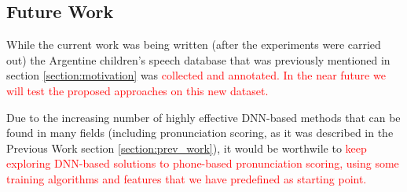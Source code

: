 \subsection{Future Work}

While the current work was being written (after the experiments were carried out)
the Argentine children's speech database that was previously mentioned in section
\ref{section:motivation} was \textcolor{red}{
  collected and annotated. In the near future we will test the proposed approaches
  on this new dataset.
}


Due to the increasing number of highly effective DNN-based methods that can be found in
many fields (including pronunciation scoring,
as it was described in the Previous Work section \ref{section:prev_work}),
it would be worthwile to \textcolor{red}{
keep exploring DNN-based solutions to phone-based pronunciation scoring, using
some training algorithms and features that we have predefined as starting point.}


